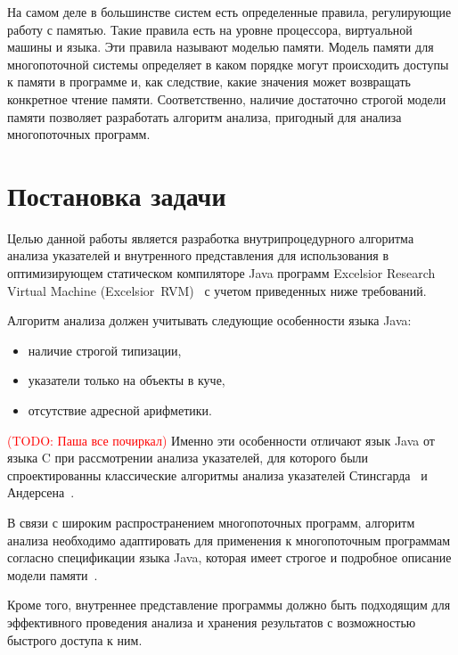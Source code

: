 \documentclass[14pt,titlepage]{extarticle}
\newcommand{\todo}[1]{\textcolor{red}{(\eng{TODO}: #1)}}
\newcommand{\eng}[1]{{\English#1}}
\let\oldsection\section
\renewcommand{\section}{\newpage\oldsection}
\begin{document}
      На самом деле в большинстве систем есть определенные правила,
      регулирующие работу с памятью. Такие правила есть на уровне процессора,
      виртуальной машины и языка. Эти правила называют моделью памяти.
      Модель памяти для многопоточной системы определяет в каком
      порядке могут происходить доступы к памяти в программе и, как следствие,
      какие значения может возвращать конкретное чтение памяти. Соответственно,
      наличие достаточно строгой модели памяти позволяет разработать алгоритм
      анализа, пригодный для анализа многопоточных программ.


  \section{Постановка задачи}

    Целью данной работы является разработка внутрипроцедурного алгоритма
    анализа указателей и внутренного представления для использования в
    оптимизирующем статическом компиляторе Java программ \eng{Excelsior
    Research Virtual Machine (Excelsior~RVM)}~\cite{excelsior_jet} с учетом
    приведенных ниже требований.

    Алгоритм анализа должен учитывать следующие особенности языка Java:
    \begin{itemize}
      \item наличие строгой типизации,
      \item указатели только на объекты в куче,
      \item отсутствие адресной арифметики.
    \end{itemize}
    \todo{Паша все почиркал}
    Именно эти особенности отличают язык Java от языка C при рассмотрении
    анализа указателей, для которого были спроектированны классические
    алгоритмы анализа указателей Стинсгарда~\cite{steensgaard} и
    Андерсена~\cite{andersen}.

    В связи с широким распространением многопоточных программ, алгоритм анализа
    необходимо адаптировать для применения к многопоточным программам согласно
    спецификации языка Java, которая имеет строгое и подробное описание модели
    памяти~\cite{manson_jmm}.

    Кроме того, внутреннее представление программы должно быть подходящим для
    эффективного проведения анализа и хранения результатов с возможностью
    быстрого доступа к ним.
\end{document}
